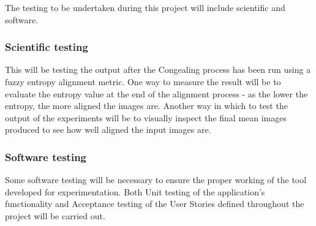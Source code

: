 The testing to be undertaken during this project will include scientific and software.

\subsubsection{Scientific testing}

This will be testing the output after the \Gls{Congealing} process has been run using a fuzzy entropy alignment metric. One way to measure the result will be to evaluate the entropy value at the end of the alignment process - as the lower the entropy, the more aligned the images are. Another way in which to test the output of the experiments will be to visually inspect the final mean images produced to see how well aligned the input images are.

\subsubsection{Software testing}

Some software testing will be necessary to ensure the proper working of the tool developed for experimentation. Both Unit testing of the application's functionality and Acceptance testing of the User Stories defined throughout the project will be carried out.

